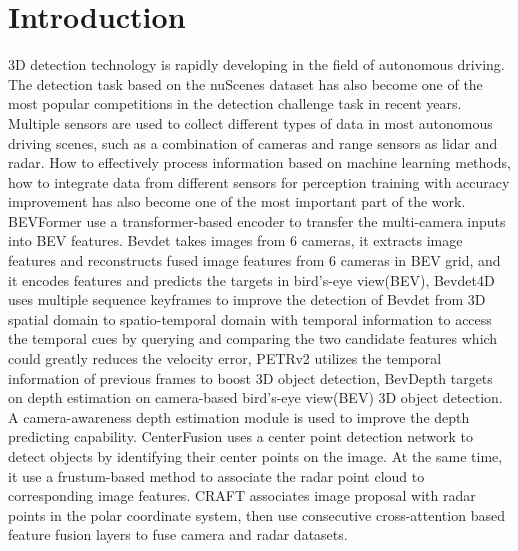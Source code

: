 \documentclass[10pt,twocolumn,letterpaper]{article}
\begin{document}
\section{Introduction}
 3D detection technology is rapidly developing in the field of autonomous driving. The detection task based on the nuScenes dataset has also become one of the most popular competitions in the detection challenge task in recent years. Multiple sensors are used to collect different types of data in most autonomous driving scenes, such as a combination of cameras and range sensors as lidar and radar. How to effectively process information based on machine learning methods, how to integrate data from different sensors for perception training with accuracy improvement has also become one of the most important part of the work. BEVFormer\cite{li2022bevformer} use a transformer-based encoder to transfer the multi-camera inputs into BEV features. Bevdet\cite{huang2021bevdet} takes images from 6 cameras, it extracts image features and reconstructs fused image features from 6 cameras in BEV grid, and it encodes features and predicts the targets in bird’s-eye view(BEV), Bevdet4D\cite{huang2022bevdet4d} uses multiple sequence keyframes to improve the detection of Bevdet from 3D spatial domain to spatio-temporal domain with temporal information to access the temporal cues by querying and comparing the two candidate features which could greatly reduces the velocity error, PETRv2\cite{liu2022petrv2} utilizes the temporal information of previous frames to boost 3D object detection, BevDepth\cite{li2022bevdepth} targets on depth estimation on camera-based bird’s-eye view(BEV) 3D object detection. A camera-awareness depth estimation module is used to improve the depth predicting capability. CenterFusion\cite{nabati2021centerfusion} uses a center point detection network to detect objects by identifying their center points on the image. At the same time, it use a frustum-based method to associate the radar point cloud to corresponding image features. CRAFT\cite{kim2022craft} associates image proposal with radar points in the polar coordinate system, then use consecutive cross-attention based feature fusion layers to fuse camera and radar datasets.
 
\end{document}
